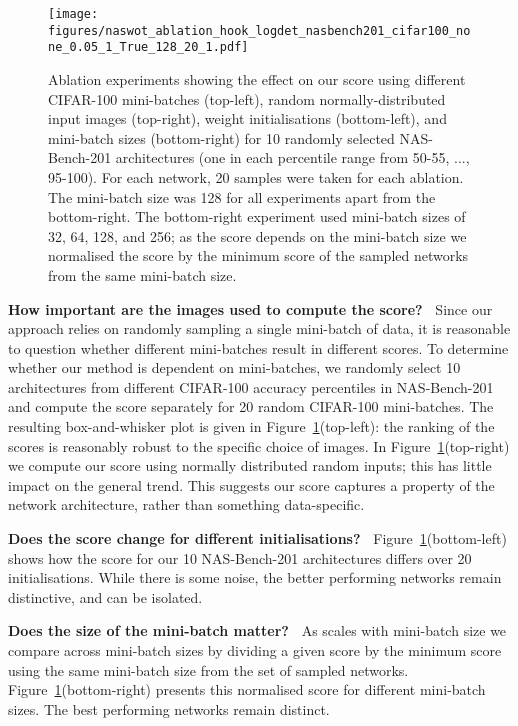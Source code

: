 \documentclass{article}
\begin{document}
\begin{figure}[!h]
    \centering
    \texttt{[image: figures/naswot\_ablation\_hook\_logdet\_nasbench201\_cifar100\_none\_0.05\_1\_True\_128\_20\_1.pdf]}
  \caption{Ablation experiments showing the effect on our score using different CIFAR-100 mini-batches (top-left), random normally-distributed input images (top-right), weight initialisations (bottom-left), and mini-batch sizes (bottom-right) for 10 randomly selected NAS-Bench-201 architectures (one in each  percentile range from 50-55, ..., 95-100). For each network, 20 samples were taken for each ablation. The mini-batch size was 128 for all experiments apart from the bottom-right. The bottom-right experiment used mini-batch sizes of 32, 64, 128, and 256; as the score depends on the mini-batch size we normalised the score by the minimum score of the sampled networks from the same mini-batch size.
  }
    \label{fig:ablationscore}  
    \vspace{-4mm}
\end{figure}

\textbf{How important are the images used to compute the score?\ } Since our approach relies on randomly sampling a single mini-batch of data, it is reasonable to question whether different mini-batches result in different scores. To determine whether our method is dependent on mini-batches, we randomly select 10 architectures from different CIFAR-100 accuracy percentiles in NAS-Bench-201 and compute the score separately for 20 random CIFAR-100 mini-batches. The resulting box-and-whisker plot is given in Figure~\ref{fig:ablationscore}(top-left): the ranking of the scores is reasonably robust to the specific choice of images. In Figure~\ref{fig:ablationscore}(top-right) we compute our score using normally distributed random inputs; this has little impact on the general trend. This suggests our score captures a property of the network architecture, rather than something data-specific.

\textbf{Does the score change for different initialisations?\ } Figure~\ref{fig:ablationscore}(bottom-left) shows how the score for our 10 NAS-Bench-201 architectures differs over 20 initialisations. While there is some noise, the better performing networks remain distinctive, and can be isolated.



\textbf{Does the size of the mini-batch matter?\ } As  scales with mini-batch size we compare across mini-batch sizes by dividing a given score by the minimum score using the same mini-batch size from the set of sampled networks.  
Figure~\ref{fig:ablationscore}(bottom-right)
presents this normalised score for different mini-batch sizes. The best performing networks remain distinct.
\end{document}
